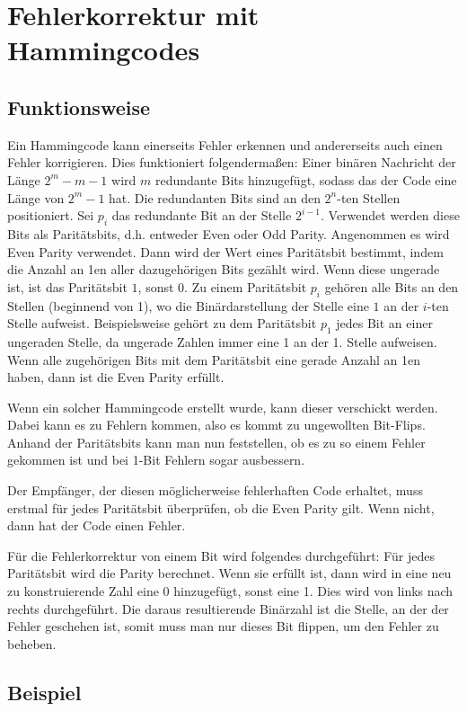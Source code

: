 \section{Fehlerkorrektur mit Hammingcodes}

\subsection{Funktionsweise}
Ein Hammingcode kann einerseits Fehler erkennen und andererseits auch einen Fehler korrigieren.
Dies funktioniert folgendermaßen: Einer binären Nachricht der Länge $2^m - m - 1$ wird $m$ redundante Bits
hinzugefügt, sodass das der Code eine Länge von $2^m - 1$ hat. Die redundanten Bits sind an den $2^n$-ten Stellen positioniert.
Sei $p_i$ das redundante Bit an der Stelle $2^{i - 1}$. Verwendet werden diese Bits als Paritätsbits, d.h. entweder Even oder Odd Parity.
Angenommen es wird Even Parity verwendet. Dann wird der Wert eines Paritätsbit bestimmt, indem die Anzahl an 1en aller dazugehörigen Bits
gezählt wird. Wenn diese ungerade ist, ist das Paritätsbit $1$, sonst $0$. Zu einem Paritätsbit $p_i$ gehören alle Bits an den Stellen
(beginnend von 1), wo die Binärdarstellung der Stelle eine $1$ an der $i$-ten Stelle aufweist. Beispielsweise gehört zu dem Paritätsbit $p_1$
jedes Bit an einer ungeraden Stelle, da ungerade Zahlen immer eine 1 an der 1. Stelle aufweisen. Wenn alle zugehörigen Bits mit dem
Paritätsbit eine gerade Anzahl an 1en haben, dann ist die Even Parity erfüllt. \cite{hamming}

Wenn ein solcher Hammingcode erstellt wurde, kann dieser verschickt werden. Dabei kann es zu Fehlern kommen, also es kommt zu ungewollten
Bit-Flips. Anhand der Paritätsbits kann man nun feststellen, ob es zu so einem Fehler gekommen ist und bei 1-Bit Fehlern sogar ausbessern. \cite{hamming}

Der Empfänger, der diesen möglicherweise fehlerhaften Code erhaltet, muss erstmal für jedes Paritätsbit überprüfen, ob die Even Parity gilt.
Wenn nicht, dann hat der Code einen Fehler.

Für die Fehlerkorrektur von einem Bit wird folgendes durchgeführt: Für jedes Paritätsbit wird die Parity berechnet. Wenn sie erfüllt ist, dann
wird in eine neu zu konstruierende Zahl eine 0 hinzugefügt, sonst eine 1. Dies wird von links nach rechts durchgeführt. Die daraus resultierende
Binärzahl ist die Stelle, an der der Fehler geschehen ist, somit muss man nur dieses Bit flippen, um den Fehler zu beheben.

\subsection{Beispiel}





